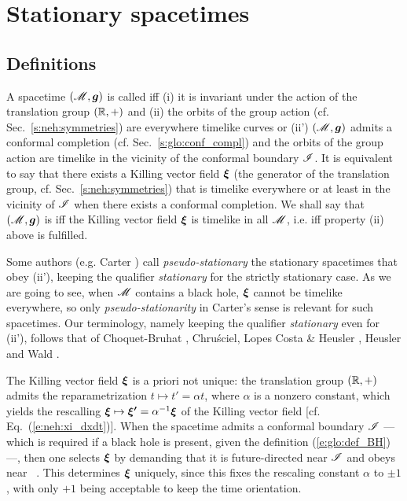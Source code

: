 \section{Stationary spacetimes} \label{s:sta:sta_st}

\subsection{Definitions} \label{s:sta:def_station}

\begin{greybox}
A spacetime $(\mathscr{M},\bm{g})$ is called 
iff (i) it is invariant under
the action of the translation group $(\mathbb{R},+)$ and (ii) the orbits of
the group action (cf. Sec.~\ref{s:neh:symmetries})
are everywhere timelike curves or (ii') $(\mathscr{M},\bm{g})$
admits a conformal completion (cf. Sec.~\ref{s:glo:conf_compl})
and the orbits of the group action are timelike in the vicinity of
the conformal boundary $\mathscr{I}$.
It is equivalent to say that there exists a Killing vector field
$\bm{\xi}$ (the generator of the translation group, cf. Sec.~\ref{s:neh:symmetries}) that is
timelike everywhere or at least in the vicinity of $\mathscr{I}$ when there exists a conformal
completion. We shall say that $(\mathscr{M},\bm{g})$ is  iff the Killing vector field $\bm{\xi}$ is timelike in all $\mathscr{M}$,
i.e. iff property (ii) above is fulfilled.
\end{greybox}

\begin{remark} \label{r:sta:pseudo-stationary}
Some authors (e.g. Carter \cite{Carte73b}) call
\emph{pseudo-stationary} the stationary spacetimes
that obey (ii'), keeping the qualifier
\emph{stationary} for the strictly stationary case.
As we are going to see, when $\mathscr{M}$
contains a black hole, $\bm{\xi}$ cannot be timelike everywhere,
so only \emph{pseudo-stationarity} in Carter's sense is relevant for such spacetimes.
Our terminology, namely keeping the qualifier \emph{stationary} even for (ii'),  follows that of
Choquet-Bruhat \cite{Choqu09},
Chru\'sciel, Lopes Costa \& Heusler \cite{ChrusLH12},
Heusler \cite{Heusl96}
and Wald \cite{Wald01}.
\end{remark}

The Killing vector field $\bm{\xi}$ is a priori not unique: the translation group $(\mathbb{R},+)$
admits the reparametrization
$t\mapsto t' = \alpha t$, where $\alpha$ is a nonzero constant, which yields
the rescalling $\bm{\xi} \mapsto \bm{\xi'} = \alpha^{-1} \bm{\xi}$
of the Killing vector field [cf. Eq.~(\ref{e:neh:xi_dxdt})]. When the
spacetime admits a conformal boundary $\mathscr{I}$ --- which is required if a black hole
is present, given the definition (\ref{e:glo:def_BH}) ---, then
one selects $\bm{\xi}$ by demanding that it is future-directed near $\mathscr{I}$ and
obeys
\be \label{e:sta:xi_scri}
    \w{\xi}\cdot\w{\xi}  \quad \mbox{near\ } \scri .
\ee
This determines $\bm{\xi}$ uniquely, since this fixes
the rescaling constant $\alpha$ to $\pm 1$, with only $+1$ being acceptable
to keep the time orientation.

